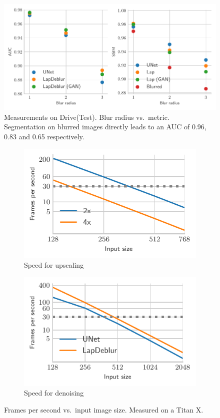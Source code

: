 \documentclass{scrartcl}
\begin{document}
\begin{figure}[htb]
\centering
\includegraphics[]{deblur_complete_paper}
\caption{Measurements on Drive(Test).
  Blur radius vs.\ metric.\\
Segmentation on blurred images directly leads to an AUC of 0.96, 0.83 and 0.65 respectively.}
\label{fig:benchmark}
\end{figure}

\begin{figure}[htb]
\centering
\begin{subfigure}{0.45\textwidth}
\centering
    \includegraphics[]{time_upscaling_paper}
    \caption{Speed for upscaling}
\end{subfigure}\quad\qquad%
\begin{subfigure}{0.45\textwidth}
\centering
    \includegraphics{time_denoising_paper}
    \caption{Speed for denoising}
\end{subfigure}
\caption{Frames per second vs.\ input image size.
Measured on a Titan X.}
\label{fig:benchmark}
\end{figure}
\end{document}
